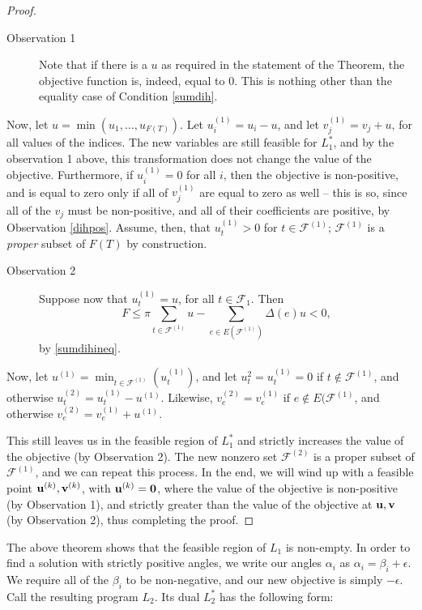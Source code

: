 \documentclass{acmart}
\newcommand{\thm}[2]{\begin{#1} #2 \end{#1}}
\begin{document}
\thm{proof}
{
\begin{description}
\item[Observation 1] Note that if there is a $u$ as required in the
statement of  the Theorem, the objective function is, indeed, equal to
$0$. This is nothing other than the equality case of Condition \ref{sumdih}.
\end{description}

Now, let $u = \min(u_1, \dots, u_{F(T)})$. 
Let $u_i^{(1)} = u_i - u$, and let $v_j^{(1)} = v_j + u$, for
all values of the indices. The new variables are still feasible
for $L_1^*$, and by the observation 1 above, this transformation
does not change the value of the objective. Furthermore, if
$u_i^{(1)} = 0$ for all $i$, then the objective is non-positive,
and is equal to zero only if all of $v_j^{(1)}$ are equal to zero 
as well -- this is so, since all of the $v_j$ must be non-positive, and
all of their coefficients are positive, by Observation \ref{dihpos}. 
Assume, then, that $u_t^{(1)}>0$ for $t \in \mathcal{F}^{(1)}$; 
$\mathcal{F}^{(1)}$ is a \emph{proper} subset of $F(T)$ by
construction.

\begin{description}
\item[Observation 2] Suppose now that $u_t^{(1)} = u$, for all 
$t \in \mathcal{F}_1$. Then 
$$F\leq \pi \sum_{t\in \mathcal{F}^{(1)}}u-
\sum_{e\in E(\mathcal{F}^{(1)})} \Delta(e) u < 0,$$ by
\ref{sumdihineq}.
\end{description}

Now, let $u^{(1)}  = \min_{t \in \mathcal{F}^{(1)}}(u_t^{(1)})$, and
let $u_t^{2}=u_t^{(1)}=0$ if $t \notin \mathcal{F}^{(1)}$, and otherwise
$u_t^{(2)} = u_t^{(1)}-u^{(1)}$. Likewise, $v_e^{(2)} = v_e^{(1)}$
if $e \notin E(\mathcal{F}^{(1)}$, and otherwise 
$v_e^{(2)}= v_e^{(1)} + u^{(1)}$. 

This still leaves us in the feasible region of $L_1^*$ and strictly
increases the value of the objective (by Observation 2). The new 
nonzero set $\mathcal{F}^{(2)}$ is a proper subset of $\mathcal{F}^{(1)}$,
and we can repeat this process. In the end, we will wind up with 
a feasible point ${\bf u}^{(k)}, {\bf v}^{(k)}$, with 
${\bf u}^{(k)} = {\bf 0}$,  where the value
of the objective is non-positive (by Observation 1), and strictly
greater than the value of the objective at ${\bf u}, {\bf v}$ (by
Observation 2), thus completing the proof.
}

The above theorem shows that the feasible region of $L_1$ is 
non-empty. In order to find a solution with strictly positive 
angles, we write our angles $\alpha_i$ as $\alpha_i = \beta_i+\epsilon$.
We require all of the $\beta_i$ to be non-negative, and
our new objective is simply $-\epsilon.$
Call the resulting program $L_2$. Its dual $L_2^*$ has the following
form:
\end{document}
